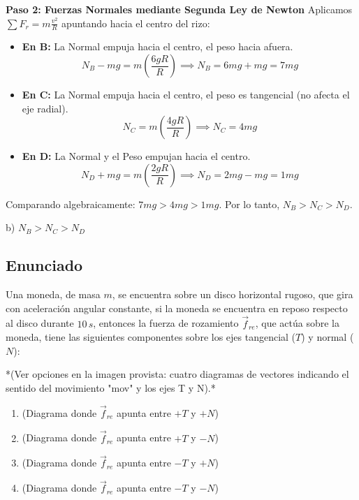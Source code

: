 \documentclass[12pt, a4paper]{article}
\begin{document}
\textbf{Paso 2: Fuerzas Normales mediante Segunda Ley de Newton}
Aplicamos $\sum F_r = m \frac{v^2}{R}$ apuntando hacia el centro del rizo:
\begin{itemize}
    \item \textbf{En B:} La Normal empuja hacia el centro, el peso hacia afuera.
    $$ N_B - mg = m\left(\frac{6gR}{R}\right) \implies N_B = 6mg + mg = 7mg $$
    \item \textbf{En C:} La Normal empuja hacia el centro, el peso es tangencial (no afecta el eje radial).
    $$ N_C = m\left(\frac{4gR}{R}\right) \implies N_C = 4mg $$
    \item \textbf{En D:} La Normal y el Peso empujan hacia el centro.
    $$ N_D + mg = m\left(\frac{2gR}{R}\right) \implies N_D = 2mg - mg = 1mg $$
\end{itemize}

Comparando algebraicamente: $7mg > 4mg > 1mg$. Por lo tanto, $N_B > N_C > N_D$.

\begin{tcolorbox}[colback=green!5!white, colframe=green!50!black, title=Respuesta Final]
\centering \Large b) $N_B > N_C > N_D$
\end{tcolorbox}

\newpage

\subsection*{Enunciado}
Una moneda, de masa $m$, se encuentra sobre un disco horizontal rugoso, que gira con aceleración angular constante, si la moneda se encuentra en reposo respecto al disco durante $10\,\si{s}$, entonces la fuerza de rozamiento $\vec{f}_{re}$, que actúa sobre la moneda, tiene las siguientes componentes sobre los ejes tangencial ($T$) y normal ($N$):

*(Ver opciones en la imagen provista: cuatro diagramas de vectores indicando el sentido del movimiento "mov" y los ejes T y N).*

\begin{enumerate}[label=\alph*)]
    \item (Diagrama donde $\vec{f}_{re}$ apunta entre $+T$ y $+N$)
    \item (Diagrama donde $\vec{f}_{re}$ apunta entre $+T$ y $-N$)
    \item (Diagrama donde $\vec{f}_{re}$ apunta entre $-T$ y $+N$)
    \item (Diagrama donde $\vec{f}_{re}$ apunta entre $-T$ y $-N$)
\end{enumerate}
\end{document}

